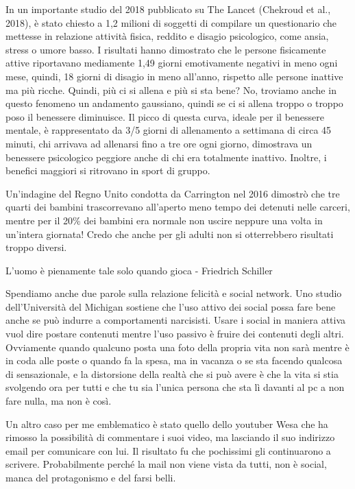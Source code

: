 \documentclass[12pt]{book} %
\begin{document}
\begin{mdframed}[linewidth=1pt]
In un importante studio del 2018 pubblicato su The Lancet (Chekroud et al.,
2018), è stato chiesto a 1,2 milioni
di soggetti di compilare un questionario che mettesse in relazione attività fisica, reddito e disagio psicologico, come
ansia, stress o umore basso. I risultati hanno dimostrato che le persone fisicamente attive riportavano mediamente 1,49
giorni emotivamente negativi in meno ogni mese, quindi, 18 giorni di disagio in meno all'anno,
rispetto alle persone inattive ma più ricche. Quindi, più ci si allena e più si sta bene? No, troviamo anche in questo
fenomeno un andamento gaussiano, quindi se ci si allena troppo o troppo poso il benessere diminuisce. Il picco di
questa curva, ideale per il benessere mentale, è rappresentato da 3/5 giorni di allenamento a settimana di circa 45
minuti, chi arrivava ad allenarsi fino a tre ore ogni giorno, dimostrava un benessere psicologico peggiore anche di chi
era totalmente inattivo. Inoltre, i benefici maggiori si ritrovano in sport di gruppo.


\bigskip

Un'indagine del Regno Unito condotta da Carrington nel 2016 dimostrò che tre quarti dei bambini
trascorrevano all'aperto meno tempo dei detenuti nelle carceri, mentre per il 20\% dei bambini era
normale non uscire neppure una volta in un'intera giornata! Credo che anche per gli adulti non si
otterrebbero risultati troppo diversi.


\bigskip

L'uomo è pienamente tale solo quando gioca - Friedrich Schiller 


\bigskip

Spendiamo anche due parole sulla relazione felicità e social network. Uno studio dell'Università del Michigan sostiene
che l'uso attivo dei social possa fare bene anche se può indurre a comportamenti narcisisti. Usare
i social in maniera attiva vuol dire postare contenuti mentre l'uso passivo è fruire dei contenuti
degli altri. Ovviamente quando qualcuno posta una foto della propria vita non sarà mentre è in coda alle poste o quando
fa la spesa, ma in vacanza o se sta facendo qualcosa di sensazionale, e la distorsione della realtà che si può avere è
che la vita si stia svolgendo ora per tutti e che tu sia l'unica persona che sta lì davanti al pc
a non fare nulla, ma non è così. 

Un altro caso per me emblematico è stato quello dello youtuber Wesa che ha rimosso la possibilità di commentare i suoi
video, ma lasciando il suo indirizzo email per comunicare con lui. Il risultato fu che pochissimi gli continuarono a
scrivere. Probabilmente perché la mail non viene vista da tutti, non è social, manca del protagonismo e del farsi
belli.
\end{mdframed}
\end{document}
